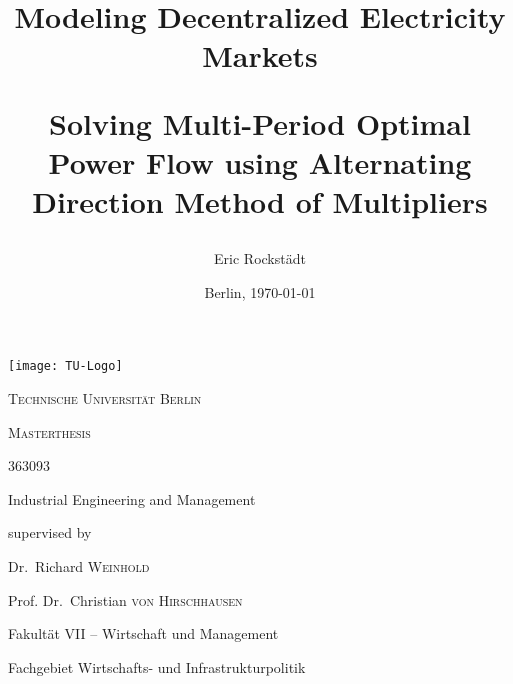 \documentclass[12pt, a4paper, oneside, bibliography=totoc, numbers=noendperiod]{scrartcl}
\title{\Huge\textbf{Modeling Decentralized Electricity Markets}\par\vspace{0.5cm} \Large Solving Multi-Period Optimal Power Flow using Alternating Direction Method of Multipliers}
\author{Eric Rockstädt}
\date{Berlin, \today}
\begin{document}
\begin{titlepage}
	\centering
	\texttt{[image: TU-Logo]}\par\vspace{1cm}
	{\scshape\Large Technische Universität Berlin \par}
	\vspace{1cm}
	{\scshape\Huge Masterthesis\par}
	\vspace{1cm}
	{\@title \par}
	\vspace{1cm}
	{\Large \textit{\@author} \par \large 363093 \par Industrial Engineering and Management \par}
	\vspace{1.5cm}
	\large
	supervised by\par
	Dr.~Richard \textsc{Weinhold}\par
	Prof. Dr.~Christian \textsc{von Hirschhausen} \par
	\vspace{0.5cm}
	Fakultät VII – Wirtschaft und Management \par
	Fachgebiet
Wirtschafts- und Infrastrukturpolitik \par
	\vfill
	{\large \@date\par}
\end{titlepage}

\newpage



\newpage


\newpage


\newpage

\tableofcontents
\newpage

\chead{\textit{\listfigurename}} 
\listoffigures
\newpage

\chead{\textit{\listtablename}} 
\listoftables
\newpage

\chead{\textit{\lstlistlistingname}} 
\lstlistoflistings
\newpage


\printnomenclature
\newpage
\end{document}
